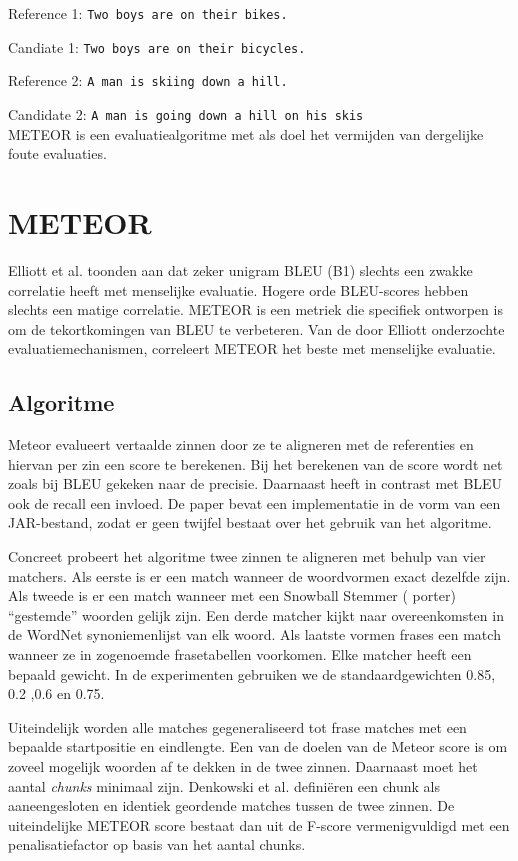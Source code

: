 Reference 1: \texttt{Two boys are on their bikes.}

Candiate 1: \texttt{Two boys are on their bicycles.}

Reference 2: \texttt{A man is skiing down a hill.}

Candidate 2: \texttt{A man is going down a hill on his skis}
\\


METEOR is een evaluatiealgoritme met als doel het vermijden van dergelijke foute evaluaties.

\section{METEOR}
Elliott et al.  toonden aan dat zeker unigram BLEU (B1) slechts een zwakke correlatie heeft met menselijke evaluatie. Hogere orde BLEU-scores hebben slechts een matige correlatie. METEOR is een metriek die specifiek ontworpen is om de tekortkomingen van BLEU te verbeteren. Van de door Elliott onderzochte evaluatiemechanismen, correleert METEOR het beste met menselijke evaluatie.

\subsection{Algoritme}
Meteor  evalueert vertaalde zinnen door ze te aligneren met de referenties en hiervan per zin een score te berekenen. Bij het berekenen van de score wordt net zoals bij BLEU gekeken naar de precisie. Daarnaast heeft in contrast met BLEU ook de recall een invloed. De paper bevat een implementatie in de vorm van een JAR-bestand, zodat er geen twijfel bestaat over het gebruik van het algoritme.

Concreet probeert het algoritme twee zinnen te aligneren met behulp van vier matchers. Als eerste is er een match wanneer de woordvormen exact dezelfde zijn. Als tweede is er een match wanneer met een Snowball Stemmer ( porter) ``gestemde'' woorden gelijk zijn. Een derde matcher kijkt naar overeenkomsten in de WordNet synoniemenlijst van elk woord.  Als laatste vormen frases een match wanneer ze in zogenoemde frasetabellen  voorkomen.
Elke matcher heeft een bepaald gewicht. In de experimenten gebruiken we de standaardgewichten 0.85, 0.2 ,0.6 en 0.75.

Uiteindelijk worden alle matches gegeneraliseerd tot frase matches met een bepaalde startpositie en eindlengte. Een van de doelen van de Meteor score is om zoveel mogelijk woorden af te dekken in de twee zinnen. Daarnaast moet het aantal \textit{chunks} minimaal zijn. Denkowski et al. defini\"eren een chunk als aaneengesloten en identiek geordende matches tussen de twee zinnen. De uiteindelijke METEOR score bestaat dan uit de F-score vermenigvuldigd met een penalisatiefactor op basis van het aantal chunks.


